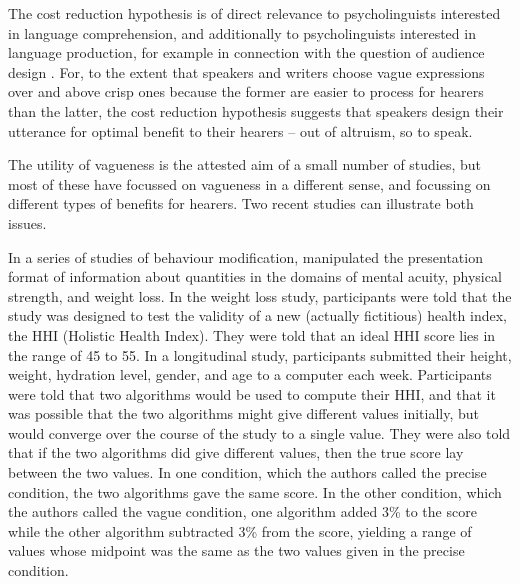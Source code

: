 \documentclass[
a4paper 
, doc
, longtable
]{apa6}
\begin{document}
The cost reduction hypothesis is of direct relevance to psycholinguists interested in language comprehension, and additionally to psycholinguists interested in language production, for example in connection with the question of audience design \cite{Clark1982287}. For, to the extent that speakers and writers choose vague expressions over and above crisp ones because the former are easier to process for hearers than the latter, the cost reduction hypothesis suggests that speakers design their utterance for optimal benefit to their hearers -- out of altruism, so to speak.

The utility of vagueness is the attested aim of a small number of studies, but most of these have focussed on vagueness in a different sense, and focussing on different types of benefits for hearers. Two recent studies can illustrate both issues. 

In a series of studies of behaviour modification, \textcite[]{Mishra01042011} manipulated the presentation format of information about quantities in the domains of mental acuity, physical strength, and weight loss. In the weight loss study, participants were told that the study was designed to test the validity of a new (actually fictitious) health index, the HHI (Holistic Health Index). They were told that an ideal HHI score lies in the range of 45 to 55. In a longitudinal study, participants submitted their height, weight, hydration level, gender, and age to a computer each week. Participants were told that two algorithms would be used to compute their HHI, and that it was possible that the two algorithms might give different values initially, but would converge over the course of the study to a single value. They were also told that if the two algorithms did give different values, then the true score lay between the two values. In one condition, which the authors called the precise condition, the two algorithms gave the same score. In the other condition, which the authors called the vague condition, one algorithm added 3\% to the score while the other algorithm subtracted 3\% from the score, yielding a range of values whose midpoint was the same as the two values given in the precise condition. 
\end{document}
